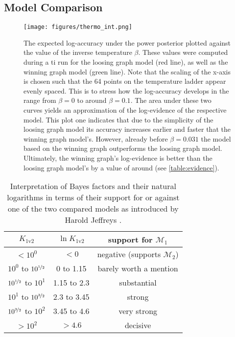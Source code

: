 \documentclass[twocolumn]{aastex631}
\begin{document}
\subsection{Model Comparison}
\label{subsec:complete_model:comparison}

\begin{figure}
    \centering
    \texttt{[image: figures/thermo\_int.png]}
    \caption{The expected log-accuracy under the power posterior plotted against the value of the inverse temperature $\beta$. These values were computed during a \gls{ti} run for the loosing graph model (red line), as well as the winning graph model (green line). Note that the scaling of the x-axis is chosen such that the 64 points on the temperature ladder appear evenly spaced. This is to stress how the log-accuracy develops in the range from $\beta=0$ to around $\beta=0.1$. The area under these two curves yields an approximation of the log-evidence of the respective model. This plot one indicates that due to the simplicity of the loosing graph model its accuracy increases earlier and faster that the winning graph model's. However, already before $\beta=0.031$ the model based on the winning graph outperforms the loosing graph model. Ultimately, the winning graph's log-evidence is better than the loosing graph model's by a value of around  (see \cref{table:evidence}).}
    \label{fig:thermo_int}
\end{figure}

\begin{table}
    \centering
    \begin{tabular}{ | c | c | c | }
        \hline
        $K_\text{1v2}$ & $\ln{K_\text{1v2}}$ & support for $\mathcal{M}_1$ \\
        \hline
        $< 10^0$ & $< 0$ & negative (supports $\mathcal{M}_2$) \\
        $10^0$ to $10^{\nicefrac{1}{2}}$ & 0 to 1.15 & barely worth a mention \\
        $10^{\nicefrac{1}{2}}$ to $10^1$ & 1.15 to 2.3 & substantial \\
        $10^1$ to $10^{\nicefrac{3}{2}}$ & 2.3 to 3.45 & strong \\
        $10^{\nicefrac{3}{2}}$ to $10^2$ & 3.45 to 4.6 & very strong \\
        $> 10^2$ & $> 4.6$ & decisive \\
        \hline
    \end{tabular}
    \caption{Interpretation of Bayes factors and their natural logarithms in terms of their support for or against one of the two compared models as introduced by Harold Jeffreys \cite{jeffreys_theory_1998}.}
    \label{table:bayes_factor}
\end{table}
\end{document}
